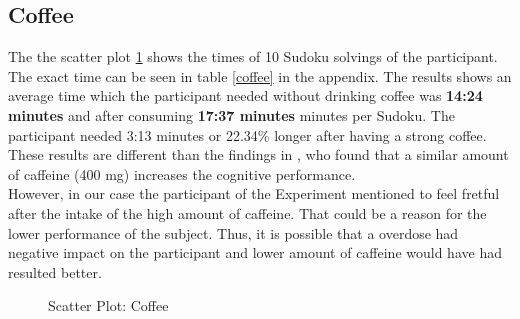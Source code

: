 \FloatBarrier
\subsection{Coffee}
The the scatter plot \ref{coffeeGraph} shows the times of 10 Sudoku solvings of the participant. The exact time can be seen in table \ref{coffee} in the appendix.
\bigbreak
The results shows an average time which the participant needed without drinking coffee was \textbf{14:24 minutes} and after consuming \textbf{17:37 minutes} minutes per Sudoku. The participant needed 3:13 minutes or 22.34\%  longer after having a strong coffee.\\
These results are different than the findings in \cite{liguori1997absorption}, who found that a similar amount of caffeine (400 mg) increases the cognitive performance. \\
However, in our case the participant of the Experiment mentioned to feel fretful after the intake of the high amount of caffeine. That could be a reason for the lower performance of the subject. Thus, it is possible that a overdose had negative impact on the participant and lower amount of caffeine would have had resulted better. 

\begin{figure}
\caption{Scatter Plot: Coffee} \label{coffeeGraph}
\end{figure}

